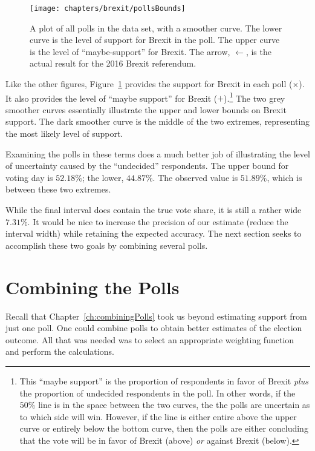 \begin{figure}\centering
 \texttt{[image: chapters/brexit/pollsBounds]}
 \caption[Brexit-2016 polls showing support level]{A plot of all polls in the data set, with a smoother curve. The lower curve is the level of support for Brexit in the poll. The upper curve is the level of ``maybe-support'' for Brexit. The arrow, $\leftarrow$, is the actual result for the 2016 Brexit referendum.}
 \label{fig:brexit-pollsBounds}
\end{figure}

Like the other figures, Figure~\ref{fig:brexit-pollsBounds} provides the support for Brexit in each poll ($\times$). It also provides the level of ``maybe support'' for Brexit ($+$).\footnote{This ``maybe support'' is the proportion of respondents in favor of Brexit \emph{plus} the proportion of undecided respondents in the poll. In other words, if the $50\%$ line is in the space between the two curves, the the polls are uncertain as to which side will win. However, if the line is either entire above the upper curve or entirely below the bottom curve, then the polls are either concluding that the vote will be in favor of Brexit (above) \emph{or} against Brexit (below).} The two grey smoother curves essentially illustrate the upper and lower bounds on Brexit support. The dark smoother curve is the middle of the two extremes, representing the most likely level of support.

Examining the polls in these terms does a much better job of illustrating the level of uncertainty caused by the ``undecided'' respondents. The upper bound for voting day is $52.18\%$; the lower, $44.87\%$. The observed value is $51.89\%$, which is between these two extremes.

While the final interval does contain the true vote share, it is still a rather wide $7.31\%$. It would be nice to increase the precision of our estimate (reduce the interval width) while retaining the expected accuracy. The next section seeks to accomplish these two goals by combining several polls.














\section{Combining the Polls}
Recall that Chapter~\ref{ch:combiningPolls} took us beyond estimating support from just one poll. One could combine polls to obtain better estimates of the election outcome. All that was needed was to select an appropriate weighting function and perform the calculations.

